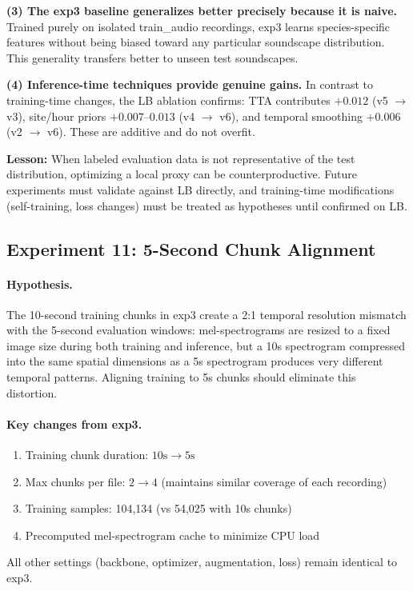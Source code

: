 \textbf{(3) The exp3 baseline generalizes better precisely because it is naive.}
Trained purely on isolated train\_audio recordings, exp3 learns species-specific
features without being biased toward any particular soundscape distribution.
This generality transfers better to unseen test soundscapes.

\textbf{(4) Inference-time techniques provide genuine gains.}
In contrast to training-time changes, the LB ablation confirms:
TTA contributes $+0.012$ (v5 $\to$ v3), site/hour priors $+0.007$--$0.013$
(v4 $\to$ v6), and temporal smoothing $+0.006$ (v2 $\to$ v6).
These are additive and do not overfit.

\textbf{Lesson:} When labeled evaluation data is not representative of the
test distribution, optimizing a local proxy can be counterproductive.
Future experiments must validate against LB directly, and training-time
modifications (self-training, loss changes) must be treated as hypotheses
until confirmed on LB.

\subsection{Experiment 11: 5-Second Chunk Alignment}
\label{sec:exp11}

\paragraph{Hypothesis.}
The 10-second training chunks in exp3 create a 2:1 temporal resolution mismatch
with the 5-second evaluation windows: mel-spectrograms are resized to a fixed
image size during both training and inference, but a 10s spectrogram compressed
into the same spatial dimensions as a 5s spectrogram produces very different
temporal patterns. Aligning training to 5s chunks should eliminate this distortion.

\paragraph{Key changes from exp3.}
\begin{enumerate}
    \item Training chunk duration: $10\text{s} \to 5\text{s}$
    \item Max chunks per file: $2 \to 4$ (maintains similar coverage of each recording)
    \item Training samples: 104,134 (vs 54,025 with 10s chunks)
    \item Precomputed mel-spectrogram cache to minimize CPU load
\end{enumerate}
All other settings (backbone, optimizer, augmentation, loss) remain identical to exp3.

